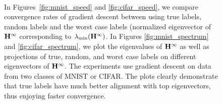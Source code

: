 \begin{figure}[t]
	\centering
	   \\
	\caption{In Figures~\ref{fig:mnist_speed} and \ref{fig:cifar_speed}, we compare  convergence rates of gradient descent between using true labels, random labels and the worst case labels (normalized eigenvector of $\mathbf{H}^\infty$ corresponding to $\lambda_{\min}(\mathbf{H}^{\infty})$.
		In Figures \ref{fig:mnist_spectrum} and \ref{fig:cifar_spectrum}, we plot the eigenvalues of $\mathbf{H}^\infty$ as well as projections of true, random, and worst case labels on different eigenvectors of $\mathbf{H}^{\infty}$. 
		The experiments use gradient descent on data from two classes of MNIST or CIFAR.
		The plots clearly demonstrate that true labels have much better alignment with top eigenvectors, thus enjoying faster convergence.
	}
	\label{fig:rate_mnist}
\end{figure}


